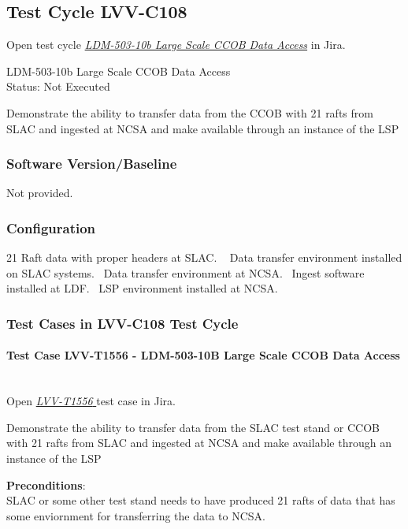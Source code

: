\documentclass[DM,lsstdraft,STR,toc]{lsstdoc}
\begin{document}
\subsection{Test Cycle LVV-C108 }

Open test cycle {\it \href{https://jira.lsstcorp.org/secure/Tests.jspa#/testrun/LVV-C108}{LDM-503-10b Large Scale CCOB Data Access}} in Jira.

LDM-503-10b Large Scale CCOB Data Access\\
Status: Not Executed

Demonstrate the ability to transfer data from the CCOB with 21 rafts
from SLAC and ingested at NCSA and make available through an instance of
the LSP\\[2\baselineskip]

\subsubsection{Software Version/Baseline}
Not provided.

\subsubsection{Configuration}
21 Raft data with proper headers at SLAC. ~ Data transfer environment
installed on SLAC systems. ~Data transfer environment at NCSA. ~Ingest
software installed at LDF. ~LSP environment installed at NCSA.~~

\subsubsection{Test Cases in LVV-C108 Test Cycle}

\paragraph{Test Case LVV-T1556 - LDM-503-10B Large Scale CCOB Data Access }\mbox{}\\

Open  \href{https://jira.lsstcorp.org/secure/Tests.jspa#/testCase/LVV-T1556}{\textit{ LVV-T1556 } }
test case in Jira.

Demonstrate the ability to transfer data from the SLAC test stand or
CCOB with 21 rafts from SLAC and ingested at NCSA and make available
through an instance of the LSP

\textbf{ Preconditions}:\\
SLAC or some other test stand needs to have produced 21 rafts of data
that has some enviornment for transferring the data to NCSA.~ ~
\end{document}
